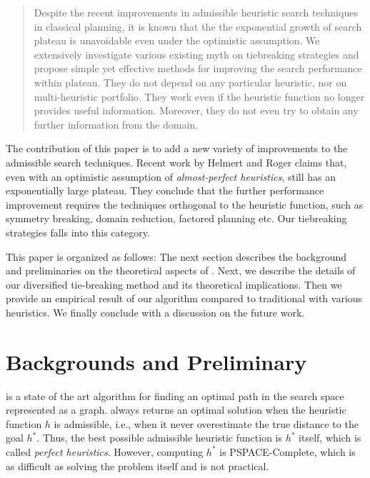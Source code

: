 \begin{abstract}
Despite the recent improvements in admissible heuristic search techniques
in classical planning, it is known that the the exponential growth of
search plateau is unavoidable even under the optimistic assumption.
We extensively investigate various existing myth on tiebreaking
 strategies and propose simple yet effective methods for improving the
 search performance within plateau.
 They do not depend on any particular heuristic, nor
 on multi-heuristic portfolio.
 They work even if the heuristic
 function no longer provides useful information.
 Moreover, they do not even try to obtain any further information from
 the domain.
\end{abstract}



The contribution of this paper is to add a new variety of improvements
to the admissible search techniques.  Recent work by Helmert and Roger
 claims that, even with an optimistic
assumption of \emph{almost-perfect heuristics}, \astar still has an
exponentially large plateau. They conclude that the further performance
improvement requires the techniques orthogonal to the heuristic
function, such as symmetry breaking, domain reduction, factored planning
etc.  Our tiebreaking strategies falls into this category.

This paper is organized as follows: The next section describes the
background and preliminaries on the theoretical aspects of
\astar. Next, we describe the details of our diversified tie-breaking
method and its theoretical implications.  Then we provide an empirical
result of our algorithm compared to traditional \astar with various
heuristics. We finally conclude with a discussion on the future work.

\section{Backgrounds and Preliminary}
\label{sec-1}


\astar is a state of the art algorithm for finding an optimal path in the
search space represented as a graph. 
\astar always returns an optimal solution when the heuristic function $h$ is
admissible, i.e., when it never overestimate the true distance to the goal
$h^*$.
% 
Thus, the best possible admissible heuristic function is $h^*$ itself, which is
called \emph{perfect heuristics}. However, computing $h^*$ is PSPACE-Complete,
which is as difficult as solving the problem itself and is not
practical.

